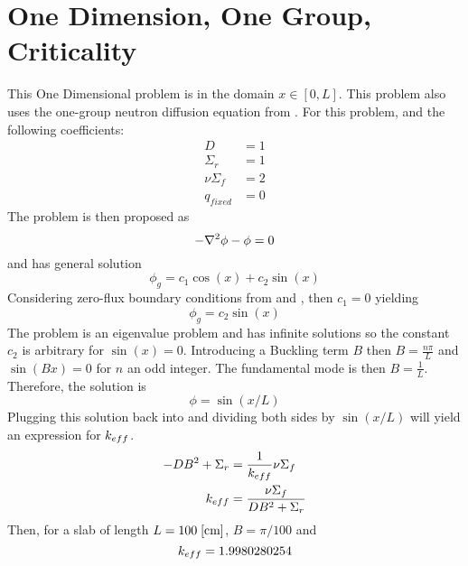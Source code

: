 \section{One Dimension, One Group, Criticality} 
  \label{sec:1d1g}
  This One Dimensional problem is in the domain $x \in [0,L]$.
  This problem also uses the one-group neutron diffusion equation from 
  . For this problem, and the following coefficients:
  \begin{align*}
    D &= 1\\
    \Sigma_r &= 1\\
    \nu \Sigma_f &= 2\\
    q_{fixed} &= 0
  \end{align*}
  The problem is then proposed as 
  \begin{equation}
    -\mathbf{\nabla}^2 \phi - \phi = 0 
  \end{equation}
  and has general solution
  \begin{equation} \label{eq:critical_general}
    \phi_g = c_1 \cos(x) + c_2 \sin(x)
  \end{equation}
  Considering zero-flux boundary conditions from  and 
  , then $c_1 = 0 $ yielding
  \begin{equation} \label{eq:sinshape}
    \phi_g = c_2 \sin(x)
  \end{equation}
  The problem is an eigenvalue problem and has infinite solutions so the 
  constant $c_2$ is arbitrary for $\sin(x)=0$. Introducing a Buckling term $B$
  then $B=\frac{n \pi}{L}$ and $\sin(Bx)=0$ for $n$ an odd integer. The 
  fundamental mode is then $B=\frac{1}{L}$. Therefore, the solution is 
  \begin{equation} \label{eq:onedimensionsol}
    \phi = \sin(x/L)
  \end{equation}
  Plugging this solution back into  and dividing both sides
  by $\sin(x/L)$ will yield an expression for $k_{eff}$.
  \begin{align}
    -D B^2 + \Sigma_r &= \frac{1}{k_{eff}} \nu \Sigma_f \\
    k_{eff} &= \frac{\nu \Sigma_f}{DB^2 + \Sigma_r} \label{eq:keff1d}
  \end{align}
  Then, for a slab of length $ L = 100 \;\text{[{cm}]} $, $B = \pi / 100$ and
  \begin{equation}
    k_{eff} = 1.9980280254
  \end{equation}
  
